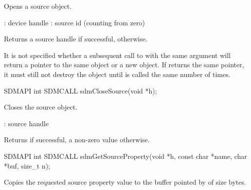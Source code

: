 \documentclass[a4paper,12pt,twoside,extrafontsizes]{memoir}
\begin{document}
\begin{funcdescr}
	Opens a source object.
\end{funcdescr}

\begin{funcparams}
	: device handle
	: source id (counting from zero)
\end{funcparams}

\begin{funcret}
	Returns a source handle if successful,  otherwise.
\end{funcret}

\begin{funcremarks}
	It is not specified whether a subsequent call to  with the same  argument will return a pointer to the same object or a new object. If  returns the same pointer, it must still not destroy the object until  is called the same number of times.
\end{funcremarks}



\begin{cfuncprototype}
SDMAPI int SDMCALL sdmCloseSource(void *h);
\end{cfuncprototype}

\begin{funcdescr}
	Closes the source object.
\end{funcdescr}

\begin{funcparams}
	: source handle
\end{funcparams}

\begin{funcret}
	Returns  if successful, a non-zero value otherwise.
\end{funcret}



\begin{cfuncprototype}
SDMAPI int SDMCALL sdmGetSourceProperty(void *h, const char *name, char *buf, size_t n);
\end{cfuncprototype}

\begin{funcdescr}
	Copies the requested source property value to the buffer pointed by  of size  bytes.
\end{funcdescr}
\end{document}
